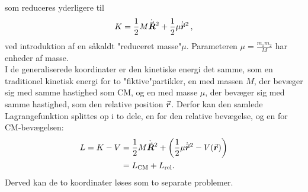 som reduceres yderligere til 
\begin{align}
	K = \frac{1}{2} M \dot{{\vec{\boldsymbol{R}}}}^2 + \frac{1}{2} \mu \dot{{\vec{\boldsymbol{r}}}}^2 \, ,
\end{align}
ved introduktion af en såkaldt "reduceret masse"\;$\mu$. Parameteren $\mu = \frac{m_1m_2}{M}$ har enheder af masse. \\
%
I de generaliserede koordinater er den kinetiske energi det samme, som en traditionel kinetisk energi for to "fiktive"\;partikler, en med massen $M$, der bevæger sig med samme hastighed som CM, og en med masse $\mu$, der bevæger sig med samme hastighed, som den relative position ${\vec{\boldsymbol{r}}}$. Derfor kan den samlede Lagrangefunktion splittes op i to dele, en for den relative bevægelse, og en for CM-bevægelsen:
\begin{equation}
\begin{aligned}
	L = K - V &= \frac{1}{2} M \dot{{\vec{\boldsymbol{R}}}}^2 + \left( \frac{1}{2}\mu \dot{{\vec{\boldsymbol{r}}}}^2 - V({\vec{\boldsymbol{r}}})\right) \\
	&= L_\text{CM} + L_\text{rel}.
\end{aligned}
\end{equation}
Derved kan de to koordinater løses som to separate problemer.
%
%
